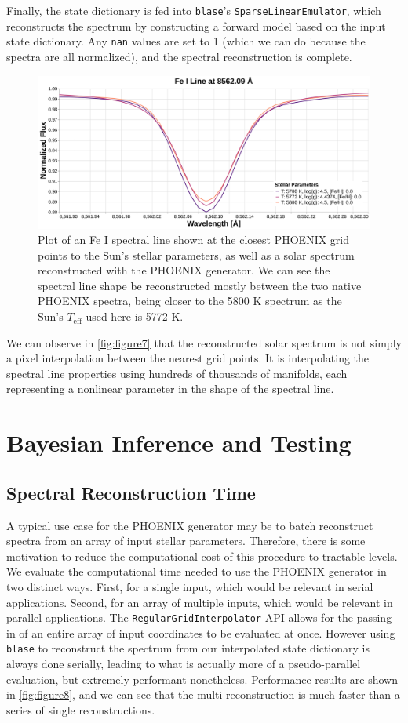 \documentclass[twocolumn, linenumbers]{aastex631}
\begin{document}
Finally, the state dictionary is fed into \texttt{blase}'s \texttt{SparseLinearEmulator}, which reconstructs the spectrum by constructing a forward model based on the input state dictionary.
Any \texttt{nan} values are set to 1 (which we can do because the spectra are all normalized), and the spectral reconstruction is complete.
\begin{figure}
    \centering
    \includegraphics[width=\textwidth]{figure7}
    \caption{Plot of an Fe I spectral line shown at the closest PHOENIX grid points to the Sun's stellar parameters, as well as a solar spectrum reconstructed with the PHOENIX generator.
    We can see the spectral line shape be reconstructed mostly between the two native PHOENIX spectra, being closer to the 5800 K spectrum as the Sun's $T_{\mathrm{eff}}$ used here is 5772 K.}
    \label{fig:figure7}
\end{figure}
We can observe in \autoref{fig:figure7} that the reconstructed solar spectrum is not simply a pixel interpolation between the nearest grid points.
It is interpolating the spectral line properties using hundreds of thousands of manifolds, each representing a nonlinear parameter in the shape of the spectral line.

\section{Bayesian Inference and Testing}
\label{sec:section4}
\subsection{Spectral Reconstruction Time}
A typical use case for the PHOENIX generator may be to batch reconstruct spectra from an array of input stellar parameters.
Therefore, there is some motivation to reduce the computational cost of this procedure to tractable levels.
We evaluate the computational time needed to use the PHOENIX generator in two distinct ways.
First, for a single input, which would be relevant in serial applications.
Second, for an array of multiple inputs, which would be relevant in parallel applications.
The \texttt{RegularGridInterpolator} API allows for the passing in of an entire array of input coordinates to be evaluated at once.
However using \texttt{blase} to reconstruct the spectrum from our interpolated state dictionary is always done serially, leading to what is actually more of a pseudo-parallel evaluation, but extremely performant nonetheless.
Performance results are shown in \autoref{fig:figure8}, and we can see that the multi-reconstruction is much faster than a series of single reconstructions.
\end{document}
